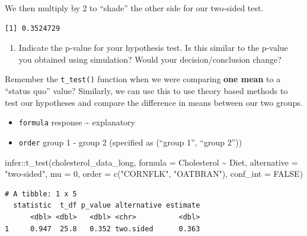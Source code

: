 \documentclass[
  letterpaper,
  DIV=11,
  numbers=noendperiod]{scrartcl}
\newenvironment{Shaded}{\begin{snugshade}}{\end{snugshade}}
\newcommand{\AttributeTok}[1]{\textcolor[rgb]{0.40,0.45,0.13}{#1}}
\newcommand{\ConstantTok}[1]{\textcolor[rgb]{0.56,0.35,0.01}{#1}}
\newcommand{\DecValTok}[1]{\textcolor[rgb]{0.68,0.00,0.00}{#1}}
\newcommand{\FunctionTok}[1]{\textcolor[rgb]{0.28,0.35,0.67}{#1}}
\newcommand{\NormalTok}[1]{\textcolor[rgb]{0.00,0.23,0.31}{#1}}
\newcommand{\SpecialCharTok}[1]{\textcolor[rgb]{0.37,0.37,0.37}{#1}}
\newcommand{\StringTok}[1]{\textcolor[rgb]{0.13,0.47,0.30}{#1}}
\providecommand{\tightlist}{%
  \setlength{\itemsep}{0pt}\setlength{\parskip}{0pt}}\usepackage{longtable,booktabs,array}
\begin{document}
We then multiply by 2 to ``shade'' the other side for our two-sided
test.

\begin{verbatim}
[1] 0.3524729
\end{verbatim}

\begin{enumerate}
\def\labelenumi{\arabic{enumi}.}
\setcounter{enumi}{27}
\tightlist
\item
  Indicate the p-value for your hypothesis test. Is this similar to the
  p-value you obtained using simulation? Would your decision/conclusion
  change?
\end{enumerate}

\vspace{0.8in}

Remember the \texttt{t\_test()} function when we were comparing
\textbf{one mean} to a ``status quo'' value? Similarly, we can use this
to use theory based methods to test our hypotheses and compare the
difference in means between our two groups.

\begin{itemize}
\tightlist
\item
  \texttt{formula} response \textasciitilde{} explanatory
\item
  \texttt{order} group 1 - group 2 (specified as (``group 1'', ``group
  2''))
\end{itemize}

\begin{Shaded}
\begin{Highlighting}[]
\NormalTok{infer}\SpecialCharTok{::}\FunctionTok{t\_test}\NormalTok{(cholesterol\_data\_long,}
       \AttributeTok{formula =}\NormalTok{ Cholesterol }\SpecialCharTok{\textasciitilde{}}\NormalTok{ Diet,}
       \AttributeTok{alternative =} \StringTok{"two{-}sided"}\NormalTok{,}
       \AttributeTok{mu =} \DecValTok{0}\NormalTok{,}
       \AttributeTok{order =} \FunctionTok{c}\NormalTok{(}\StringTok{"CORNFLK"}\NormalTok{, }\StringTok{"OATBRAN"}\NormalTok{),}
       \AttributeTok{conf\_int =} \ConstantTok{FALSE}\NormalTok{)}
\end{Highlighting}
\end{Shaded}

\begin{verbatim}
# A tibble: 1 x 5
  statistic  t_df p_value alternative estimate
      <dbl> <dbl>   <dbl> <chr>          <dbl>
1     0.947  25.8   0.352 two.sided      0.363
\end{verbatim}

\vspace{0.1in}
\end{document}
